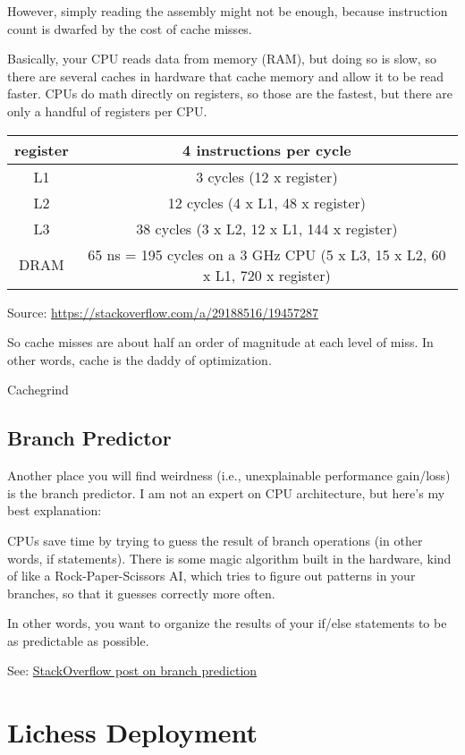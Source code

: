 \documentclass[letterpaper,11pt]{article}
\begin{document}
However, simply reading the assembly might not be enough, because instruction count is dwarfed by the cost of cache misses. 

Basically, your CPU reads data from memory (RAM), but doing so is slow, so there are several caches in hardware
that cache memory and allow it to be read faster. CPUs do math directly on registers, so those 
are the fastest, but there are only a handful of registers per CPU.

\begin{center}
\begin{tabular}{ |c|c| }
\hline
register & 4 instructions per cycle \\ 
\hline
L1       & 3 cycles (12 x register) \\
\hline
L2       & 12 cycles (4 x L1, 48 x register) \\
\hline
L3       & 38 cycles (3 x L2, 12 x L1, 144 x register) \\
\hline
DRAM     & 65 ns = 195 cycles on a 3 GHz CPU (5 x L3, 15 x L2, 60 x L1, 720 x register) \\
\hline
\end{tabular}
\end{center}
Source: \url{https://stackoverflow.com/a/29188516/19457287}

So cache misses are about half an order of magnitude at each level of miss. In other words, cache is the 
daddy of optimization.

Cachegrind

\subsection{Branch Predictor}

Another place you will find weirdness (i.e., unexplainable performance gain/loss) is the branch predictor. I am not an 
expert on CPU architecture, but here's my best explanation:

CPUs save time by trying to guess the result of branch operations (in other words, if statements). 
There is some magic algorithm built in the hardware, kind of like a Rock-Paper-Scissors AI, 
which tries to figure out patterns in your branches, so that it guesses correctly more often.

In other words, you want to organize the results of your if/else statements to be as 
predictable as possible.

See: \href{https://stackoverflow.com/questions/11227809/why-is-processing-a-sorted-array-faster-than-processing-an-unsorted-array}{StackOverflow post on branch prediction}

\section{Lichess Deployment}
\end{document}
